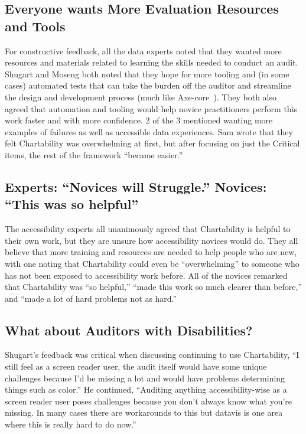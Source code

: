 \documentclass[12pt]{cmuthesis}
\begin{document}
\subsection{Everyone wants More Evaluation Resources and Tools}
For constructive feedback, all the data experts noted that they wanted more resources and materials related to learning the skills needed to conduct an audit. Shugart and Moseng both noted that they hope for more tooling and (in some cases) automated tests that can take the burden off the auditor and streamline the design and development process (much like Axe-core~\cite{Deque2021Axe}). They both also agreed that automation and tooling would help novice practitioners perform this work faster and with more confidence. 2 of the 3 mentioned wanting more examples of failures as well as accessible data experiences. Sam wrote that they felt Chartability was overwhelming at first, but after focusing on just the Critical items, the rest of the framework ``became easier.''

\subsection{Experts: ``Novices will Struggle.'' Novices: ``This was so helpful''}
The accessibility experts all unanimously agreed that Chartability is helpful to their own work, but they are unsure how accessibility novices would do. They all believe that more training and resources are needed to help people who are new, with one noting that Chartability could even be ``overwhelming'' to someone who has not been exposed to accessibility work before. All of the novices remarked that Chartability was ``so helpful,'' ``made this work so much clearer than before,'' and ``made a lot of hard problems not as hard.''

\subsection{What about Auditors with Disabilities?}
Shugart’s feedback was critical when discussing continuing to use Chartability, ``I still feel as a screen reader user, the audit itself would have some unique challenges because I’d be missing a lot and would have problems determining things such as color.'' He continued, ``Auditing anything accessibility-wise as a screen reader user poses challenges because you don’t always know what you’re missing. In many cases there are workarounds to this but datavis is one area where this is really hard to do now.'' 
\end{document}
